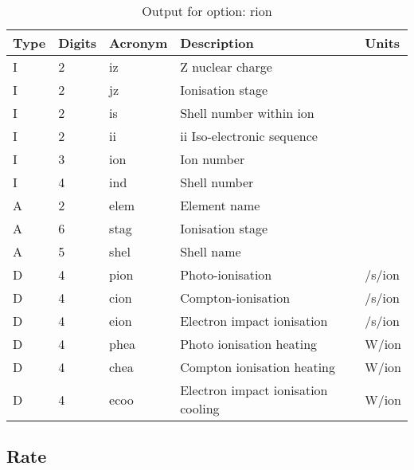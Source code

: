 \begin{table}[!p]
\caption{Output for option: rion}
\label{tabout:rion}
\begin{tabular}{lllll}
\hline
Type & Digits & Acronym & Description & Units \\ 
\hline
I &  2 & iz   & Z nuclear charge                 &                  \\
I &  2 & jz   & Ionisation stage                 &                  \\
I &  2 & is   & Shell number within ion          &                  \\
I &  2 & ii   & ii Iso-electronic sequence       &                  \\
I &  3 & ion  & Ion number                       &                  \\
I &  4 & ind  & Shell number                     &                  \\
A &  2 & elem & Element name                     &                  \\
A &  6 & stag & Ionisation stage                 &                  \\
A &  5 & shel & Shell name                       &                  \\
D &  4 & pion & Photo-ionisation                 & /s/ion           \\
D &  4 & cion & Compton-ionisation               & /s/ion           \\
D &  4 & eion & Electron impact ionisation       & /s/ion           \\
D &  4 & phea & Photo ionisation heating         & W/ion            \\
D &  4 & chea & Compton ionisation heating       & W/ion            \\
D &  4 & ecoo & Electron impact ionisation cooling& W/ion            \\
\hline
\end{tabular}
\end{table}

\subsection{Rate}

